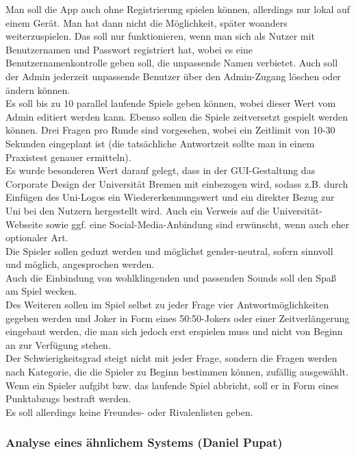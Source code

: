 \documentclass[fontsize=12pt,paper=a4,twoside]{scrartcl}
\begin{document}
Man soll die App auch ohne Registrierung spielen können, allerdings nur lokal auf einem Gerät. Man hat dann nicht die Möglichkeit, später woanders weiterzuspielen. Das soll nur funktionieren, wenn man sich als Nutzer mit Benutzernamen und Passwort registriert hat, wobei es eine Benutzernamenkontrolle geben soll, die unpassende Namen verbietet. Auch soll der Admin jederzeit unpassende Benutzer über den Admin-Zugang löschen oder ändern können.\\
Es soll bis zu 10 parallel laufende Spiele geben können, wobei dieser Wert vom Admin editiert werden kann. Ebenso sollen die Spiele zeitversetzt gespielt werden können. Drei Fragen pro Runde sind vorgesehen, wobei ein Zeitlimit von 10-30 Sekunden eingeplant ist (die tatsächliche Antwortzeit sollte man in einem Praxistest genauer ermitteln).\\
Es wurde besonderen Wert darauf gelegt, dass in der GUI-Gestaltung das Corporate Design der Universität Bremen mit einbezogen wird, sodass z.B. durch Einfügen des Uni-Logos ein Wiedererkennungswert und ein direkter Bezug zur Uni bei den Nutzern hergestellt wird. Auch ein Verweis auf die Universität-Webseite sowie ggf. eine Social-Media-Anbindung sind erwünscht, wenn auch eher optionaler Art.\\
Die Spieler sollen geduzt werden und möglichst gender-neutral, sofern sinnvoll und möglich, angesprochen werden.\\
Auch die Einbindung von wohlklingenden und passenden Sounds soll den Spaß am Spiel wecken.\\
Des Weiteren sollen im Spiel selbst zu jeder Frage vier Antwortmöglichkeiten gegeben werden und Joker in Form eines 50:50-Jokers oder einer Zeitverlängerung eingebaut werden, die man sich jedoch erst erspielen muss und nicht von Beginn an zur Verfügung stehen.\\
Der Schwierigkeitsgrad steigt nicht mit jeder Frage, sondern die Fragen werden nach Kategorie, die die Spieler zu Beginn bestimmen können, zufällig ausgewählt. \\
Wenn ein Spieler aufgibt bzw. das laufende Spiel abbricht, soll er in Form eines Punktabzugs bestraft werden. \\
Es soll allerdings keine Freundes- oder Rivalenlisten geben. 



\subsubsection{Analyse eines ähnlichem Systems (Daniel Pupat)}\label{quizduell}
\end{document}
